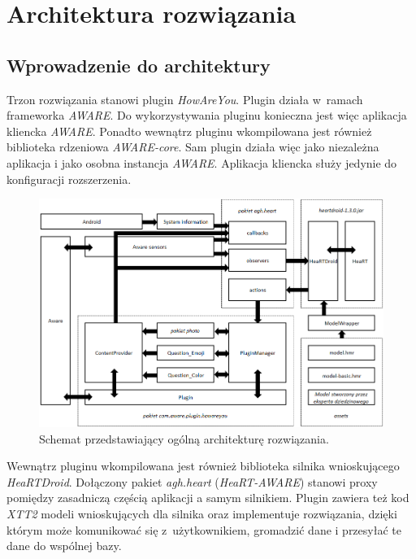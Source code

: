 \chapter{Architektura rozwiązania}
\label{cha:architekturaRozwiazania}


\section{Wprowadzenie do architektury}
\label{sec:wprowadzenieDoArchitektury}

Trzon rozwiązania stanowi plugin \textit{HowAreYou}. Plugin działa w~ramach frameworka \textit{AWARE}. Do wykorzystywania pluginu konieczna jest więc aplikacja kliencka \textit{AWARE}. Ponadto wewnątrz pluginu wkompilowana jest również biblioteka rdzeniowa \textit{AWARE-core}. Sam plugin działa więc jako niezależna aplikacja i jako osobna instancja \textit{AWARE}. Aplikacja kliencka służy jedynie do konfiguracji rozszerzenia.

\begin{figure}[H]
	\centering
	\includegraphics[scale=0.8]{rozdzial3/ArchitekturaSchemat.png}
	\caption{Schemat przedstawiający ogólną architekturę rozwiązania.}
\end{figure}

Wewnątrz pluginu wkompilowana jest również biblioteka silnika wnioskującego \textit{HeaRTDroid}. Dołączony pakiet \textit{agh.heart} (\textit{HeaRT-AWARE}) stanowi proxy pomiędzy zasadniczą częścią aplikacji a samym silnikiem. Plugin zawiera też kod \textit{XTT2} modeli wnioskujących dla silnika oraz implementuje rozwiązania, dzięki którym może komunikować się z~użytkownikiem, gromadzić dane i przesyłać te dane do wspólnej bazy. 

